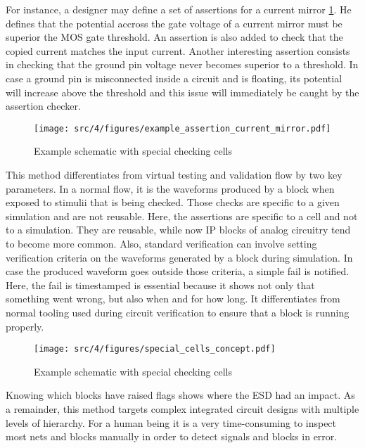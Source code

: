 For instance, a designer may define a set of assertions for a current mirror \ref{fig:ex-current-mirror-assert}.
He defines that the potential accross the gate voltage of a current mirror must be superior the MOS gate threshold.
An assertion is also added to check that the copied current matches the input current.
Another interesting assertion consists in checking that the ground pin voltage never becomes superior to a threshold.
In case a ground pin is misconnected inside a circuit and is floating, its potential will increase above the threshold and this issue will immediately be caught by the assertion checker.

\begin{figure}[!h]
  \centering
  \texttt{[image: src/4/figures/example\_assertion\_current\_mirror.pdf]}
  \caption{Example schematic with special checking cells}
  \label{fig:ex-current-mirror-assert}
\end{figure}

This method differentiates from virtual testing and validation flow by two key parameters.
In a normal flow, it is the waveforms produced by a block when exposed to stimulii that is being checked.
Those checks are specific to a given simulation and are not reusable.
Here, the assertions are specific to a cell and not to a simulation.
They are reusable, while now IP blocks of analog circuitry tend to become more common.
Also, standard verification can involve setting verification criteria on the waveforms generated by a block during simulation.
In case the produced waveform goes outside those criteria, a simple fail is notified.
Here, the fail is timestamped is essential because it shows not only that something went wrong, but also when and for how long.
It differentiates from normal tooling used during circuit verification to ensure that a block is running properly.


\begin{figure}[!h]
  \centering
  \texttt{[image: src/4/figures/special\_cells\_concept.pdf]}
  \caption{Example schematic with special checking cells}
  \label{fig:ex-special-cells}
\end{figure}

Knowing which blocks have raised flags shows where the ESD had an impact.
As a remainder, this method targets complex integrated circuit designs with multiple levels of hierarchy.
For a human being it is a very time-consuming to inspect most nets and blocks manually in order to detect signals and blocks in error.

